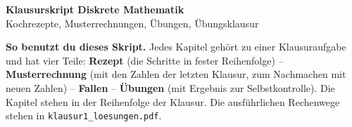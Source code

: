 
\pagestyle{fancy}\fancyhf{}
\setcounter{secnumdepth}{1}
\setcounter{tocdepth}{1}
\renewcommand{\arraystretch}{1.15}



\begin{center}
{\LARGE\bfseries Klausurskript Diskrete Mathematik}\\[4pt]
{\large Kochrezepte, Musterrechnungen, Übungen, Übungsklausur}
\end{center}

\begin{merke}
\textbf{So benutzt du dieses Skript.} Jedes Kapitel gehört zu einer Klausuraufgabe und hat vier Teile:
\textbf{Rezept} (die Schritte in fester Reihenfolge) -- \textbf{Musterrechnung} (mit den Zahlen der letzten Klausur,
zum Nachmachen mit neuen Zahlen) -- \textbf{Fallen} -- \textbf{Übungen} (mit Ergebnis zur Selbstkontrolle).
Die Kapitel stehen in der Reihenfolge der Klausur. Die ausführlichen Rechenwege stehen in
\texttt{klausur1\_loesungen.pdf}.
\end{merke}

\tableofcontents

